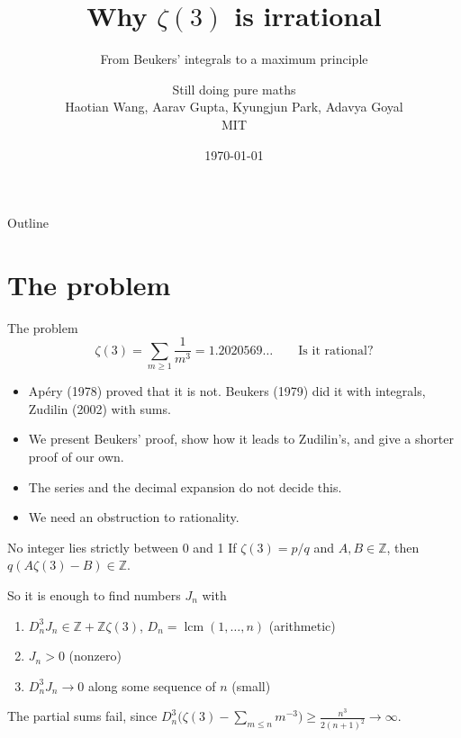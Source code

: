 \documentclass[aspectratio=169,11pt]{beamer}
\title{Why \texorpdfstring{$\zeta(3)$}{zeta(3)} is irrational}
\subtitle{From Beukers' integrals to a maximum principle}
\author{Still doing pure maths\\ \small Haotian Wang, Aarav Gupta, Kyungjun Park, Adavya Goyal\\ \small MIT}
\date{\today}
\newcommand{\Z}{\mathbb{Z}}
\newcommand{\Dn}{D_n}
\DeclareMathOperator{\lcm}{lcm}
\begin{document}
\maketitle

\begin{frame}{Outline}
  \tableofcontents
\end{frame}

\section{The problem}

\begin{frame}{The problem}
  \[
    \zeta(3)=\sum_{m\ge1}\frac1{m^3}=1.2020569\ldots
    \qquad\text{Is it rational?}
  \]
  \begin{itemize}
    \item Ap\'ery (1978) proved that it is not. Beukers (1979) did it with integrals, Zudilin (2002) with sums.
    \item We present Beukers' proof, show how it leads to Zudilin's, and give a shorter proof of our own.
    \item The series and the decimal expansion do not decide this.
    \item We need an \alert{obstruction} to rationality.
  \end{itemize}
\end{frame}

\begin{frame}{No integer lies strictly between 0 and 1}
  If $\zeta(3)=p/q$ and $A,B\in\Z$, then $q(A\zeta(3)-B)\in\Z$.
  \medskip

  So it is enough to find numbers $J_n$ with
  \begin{enumerate}
    \item $\Dn^3J_n\in\Z+\Z\zeta(3)$, \quad $\Dn=\lcm(1,\dots,n)$ \hfill(arithmetic)
    \item $J_n>0$ \hfill(nonzero)
    \item $\Dn^3J_n\to0$ along some sequence of $n$ \hfill(small)
  \end{enumerate}
  \medskip
  The partial sums fail, since $\Dn^3\bigl(\zeta(3)-\sum_{m\le n}m^{-3}\bigr)\ge\frac{n^3}{2(n+1)^2}\to\infty$.
\end{frame}
\end{document}
